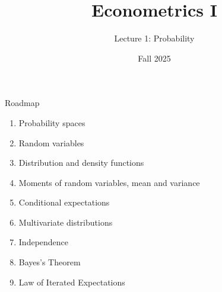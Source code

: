 \documentclass[aspectratio=169,11pt]{beamer}
\begin{document}

\title{Econometrics I}
\subtitle{Lecture 1: Probability}

\date{Fall 2025}
\maketitle


\begin{frame}{Roadmap}
\begin{enumerate}
	\item Probability spaces
	\item Random variables
	\item Distribution and density functions
	\item Moments of random variables, mean and variance
	\item Conditional expectations
	\item Multivariate distributions
	\item Independence
	\item Bayes's Theorem
	\item Law of Iterated Expectations
\end{enumerate}
\end{frame}
\end{document}
